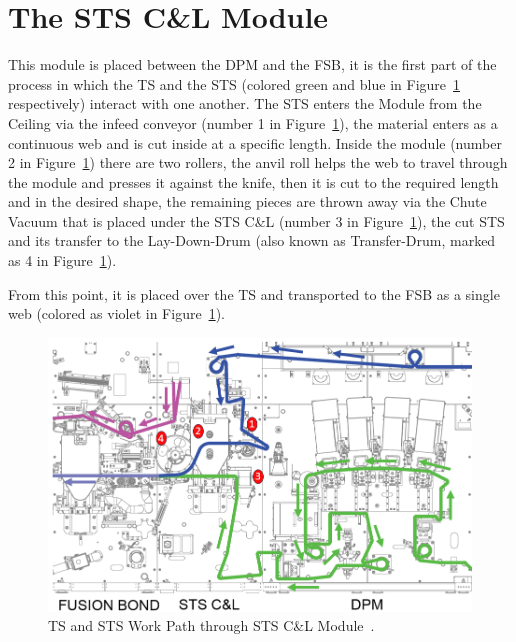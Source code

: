 \section{The STS C\&L Module}\label{sec2.1}

This module is placed between the DPM and the FSB, it is the first part of the process in which the TS and the STS (colored green and blue in Figure~\ref{flow} respectively)  interact with one another. The STS enters the Module from the Ceiling via the infeed conveyor (number 1 in Figure~\ref{flow}), the material enters as a continuous web and is cut inside at a specific length. Inside the module (number 2 in Figure~\ref{flow}) there are two rollers, the anvil roll helps the web to travel through the module and presses it against the knife, then it is cut to the required length and in the desired shape, the remaining pieces are thrown away via the Chute Vacuum that is placed under the STS C\&L (number 3 in Figure~\ref{flow}), the cut STS  and its transfer to the Lay-Down-Drum (also known as Transfer-Drum, marked as 4 in Figure~\ref{flow}).

From this point, it is placed over the TS and transported to the FSB as a single web (colored as violet in Figure~\ref{flow}). 


\begin{figure}[H]
    \centering
    \includegraphics[width=1\linewidth]{FIGURES/flow.png}
    \caption{TS and STS Work Path through STS C\&L Module~\cite{layout}.}
    \label{flow}
\end{figure}


